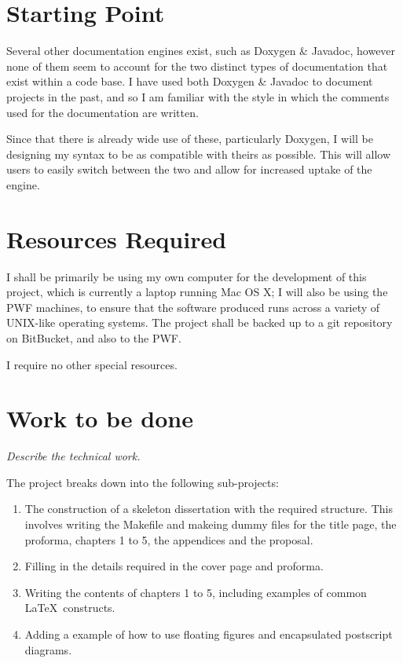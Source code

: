 \section{Starting Point}

Several other documentation engines exist, such as Doxygen \& Javadoc,
however none of them seem to account for the two distinct types of
documentation that exist within a code base. I have used both Doxygen
\& Javadoc to document projects in the past, and so I am familiar with
the style in which the comments used for the documentation are
written.

Since that there is already wide use of these, particularly Doxygen,
I will be designing my syntax to be as compatible with theirs as
possible. This will allow users to easily switch between the two and
allow for increased uptake of the engine.

\section{Resources Required}

I shall be primarily be using my own computer for the development of
this project, which is currently a laptop running Mac OS X; I will
also be using the PWF machines, to ensure that the software produced
runs across a variety of UNIX-like operating systems. The project
shall be backed up to a git repository on BitBucket, and also to the
PWF.

I require no other special resources.

\section{Work to be done}

{\em Describe the technical work.}

The project breaks down into the following sub-projects:

\begin{enumerate}

\item The construction of a skeleton dissertation with the required 
structure. This involves writing the Makefile and makeing dummy files
for the title page, the proforma, chapters 1 to 5, the appendices and
the proposal.

\item Filling in the details required in the cover page and proforma.

\item Writing the contents of chapters 1 to 5, including examples
of common \LaTeX\ constructs.

\item Adding a example of how to use floating figures and encapsulated
postscript diagrams.

\end{enumerate}

